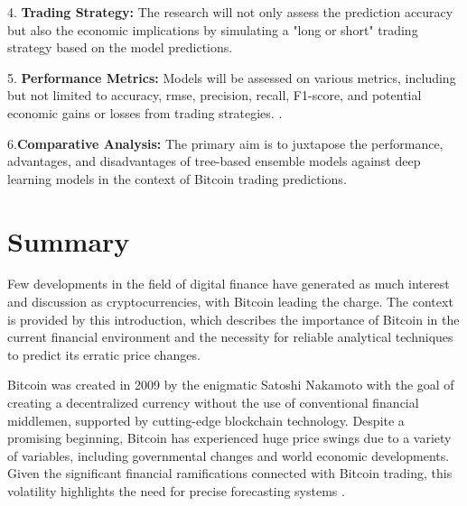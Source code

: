 \smallskip

4. \textbf{Trading Strategy:} The research will not only assess the prediction accuracy but also the economic implications by simulating a "long or short" trading strategy based on the model predictions.

\smallskip

5. \textbf{Performance Metrics:} Models will be assessed on various metrics, including but not limited to accuracy, \gls{rmse}, precision, recall, F1-score, and potential economic gains or losses from trading strategies. \citep{Goodfellow-et-al-2016}.

\smallskip

6.\textbf{Comparative Analysis:} The primary aim is to juxtapose the performance, advantages, and disadvantages of tree-based ensemble models against deep learning models in the context of Bitcoin trading predictions.



\goodbreak
\section{Summary}


Few developments in the field of digital finance have generated as much interest and discussion as cryptocurrencies, with Bitcoin leading the charge. The context is provided by this introduction, which describes the importance of Bitcoin in the current financial environment and the necessity for reliable analytical techniques to predict its erratic price changes.

\smallskip

Bitcoin was created in 2009 by the enigmatic Satoshi Nakamoto with the goal of creating a decentralized currency without the use of conventional financial middlemen, supported by cutting-edge blockchain technology. Despite a promising beginning, Bitcoin has experienced huge price swings due to a variety of variables, including governmental changes and world economic developments. Given the significant financial ramifications connected with Bitcoin trading, this volatility highlights the need for precise forecasting systems \citep{GANDAL201886}.

\smallskip

